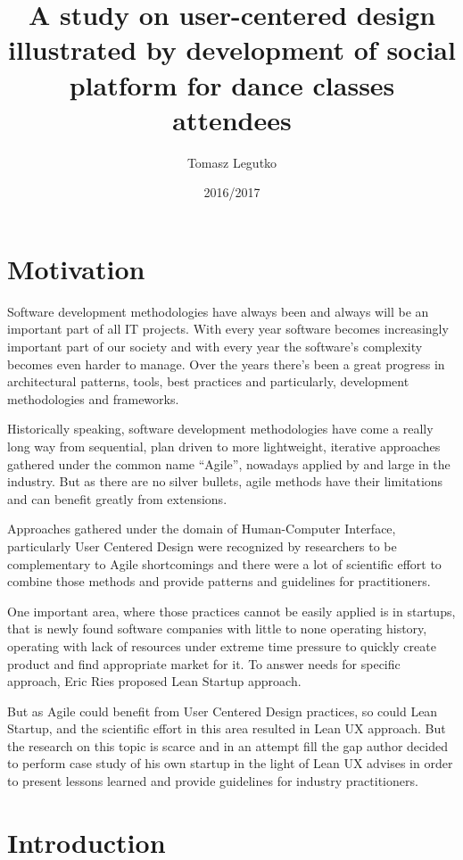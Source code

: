 \documentclass{article}
\title{A study on user-centered design illustrated by development of social platform for dance classes attendees}
\author{Tomasz Legutko}
\date{2016/2017}
\begin{document}
\maketitle
\tableofcontents
\section{Motivation}
Software development methodologies have always been and always will be an important part of all IT projects. With every year software becomes increasingly important part of our society and with every year the software's complexity becomes even harder to manage. Over the years there's been a great progress in architectural patterns, tools, best practices and particularly, development methodologies and frameworks.

Historically speaking, software development methodologies have come a really long way from sequential, plan driven to more lightweight, iterative approaches gathered under the common name ``Agile'', nowadays applied by and large in the industry. But as there are no silver bullets, agile methods have their limitations and can benefit greatly from extensions.

Approaches gathered under the domain of Human-Computer Interface, particularly User Centered Design were recognized by researchers to be complementary to Agile shortcomings and there were a lot of scientific effort to combine those methods and provide patterns and guidelines for practitioners. 

One important area, where those practices cannot be easily applied is in startups, that is newly found software companies with little to none operating history, operating with lack of resources under extreme time pressure to quickly create product and find appropriate market for it. To answer needs for specific approach, Eric Ries proposed Lean Startup approach.

But as Agile could benefit from User Centered Design practices, so could Lean Startup, and the scientific effort in this area resulted in Lean UX approach. But the research on this topic is scarce and in an attempt fill the gap author decided to perform case study of his own startup in the light of Lean UX advises in order to present lessons learned and provide guidelines for industry practitioners.

\section{Introduction} %
\end{document}
